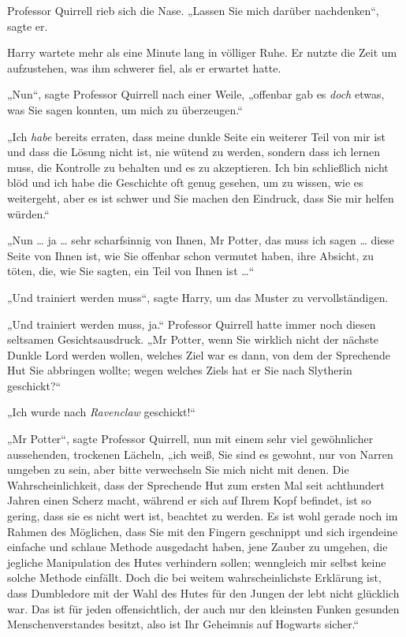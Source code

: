 {Professor Quirrell rieb sich die Nase. „Lassen Sie mich darüber nachdenken“, sagte er.

Harry wartete mehr als eine Minute lang in völliger Ruhe. Er nutzte die Zeit um aufzustehen, was ihm schwerer fiel, als er erwartet hatte.

„Nun“, sagte Professor Quirrell nach einer Weile, „offenbar gab es \emph{doch} etwas, was Sie sagen konnten, um mich zu überzeugen.“

„Ich \emph{habe} bereits erraten, dass meine dunkle Seite ein weiterer Teil von mir ist und dass die Lösung nicht ist, nie wütend zu werden, sondern dass ich lernen muss, die Kontrolle zu behalten und es zu akzeptieren. Ich bin schließlich nicht blöd und ich habe die Geschichte oft genug gesehen, um zu wissen, wie es weitergeht, aber es ist schwer und Sie machen den Eindruck, dass Sie mir helfen würden.“

„Nun … ja … sehr scharfsinnig von Ihnen, Mr Potter, das muss ich sagen … diese Seite von Ihnen ist, wie Sie offenbar schon vermutet haben, ihre Absicht, zu töten, die, wie Sie sagten, ein Teil von Ihnen ist …“

„Und trainiert werden muss“, sagte Harry, um das Muster zu vervollständigen.

„Und trainiert werden muss, ja.“ Professor Quirrell hatte immer noch diesen seltsamen Gesichtsausdruck. „Mr Potter, wenn Sie wirklich nicht der nächste Dunkle Lord werden wollen, welches Ziel war es dann, von dem der Sprechende Hut Sie abbringen wollte; wegen welches Ziels hat er Sie nach Slytherin geschickt?“

„Ich wurde nach \emph{Ravenclaw} geschickt!“

„Mr Potter“, sagte Professor Quirrell, nun mit einem sehr viel gewöhnlicher aussehenden, trockenen Lächeln, „ich weiß, Sie sind es gewohnt, nur von Narren umgeben zu sein, aber bitte verwechseln Sie mich nicht mit denen. Die Wahrscheinlichkeit, dass der Sprechende Hut zum ersten Mal seit achthundert Jahren einen Scherz macht, während er sich auf Ihrem Kopf befindet, ist so gering, dass sie es nicht wert ist, beachtet zu werden. Es ist wohl gerade noch im Rahmen des Möglichen, dass Sie mit den Fingern geschnippt und sich irgendeine einfache und schlaue Methode ausgedacht haben, jene Zauber zu umgehen, die jegliche Manipulation des Hutes verhindern sollen; wenngleich mir selbst keine solche Methode einfällt. Doch die bei weitem wahrscheinlichste Erklärung ist, dass Dumbledore mit der Wahl des Hutes für den Jungen der lebt nicht glücklich war. Das ist für jeden offensichtlich, der auch nur den kleinsten Funken gesunden Menschenverstandes besitzt, also ist Ihr Geheimnis auf Hogwarts sicher.“

}
